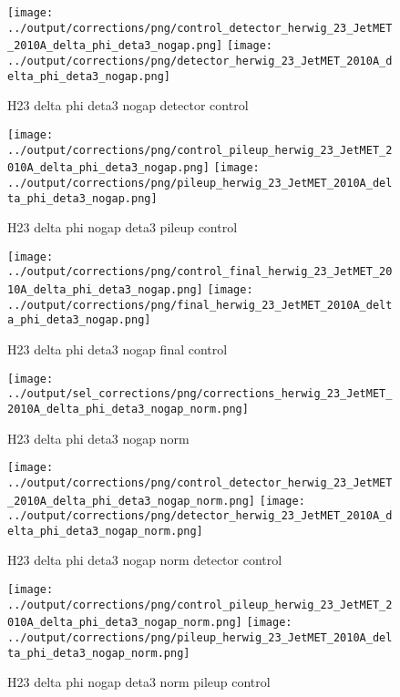 \documentclass[11pt]{book}
\begin{document}
\begin{figure}[ht]
\centering
\texttt{[image: ../output/corrections/png/control\_detector\_herwig\_23\_JetMET\_2010A\_delta\_phi\_deta3\_nogap.png]}
\texttt{[image: ../output/corrections/png/detector\_herwig\_23\_JetMET\_2010A\_delta\_phi\_deta3\_nogap.png]}
\caption{H23 delta phi deta3 nogap detector control}
\label{fig:H23_JetMET_2010A_delta_phi_deta3_nogap_detector_control}
\end{figure}

\begin{figure}[ht]
\centering
\texttt{[image: ../output/corrections/png/control\_pileup\_herwig\_23\_JetMET\_2010A\_delta\_phi\_deta3\_nogap.png]}
\texttt{[image: ../output/corrections/png/pileup\_herwig\_23\_JetMET\_2010A\_delta\_phi\_deta3\_nogap.png]}
\caption{H23 delta phi nogap deta3 pileup control}
\label{fig:H23_JetMET_2010A_delta_phi_deta3_nogap_pileup_control}
\end{figure}


\begin{figure}[ht]
\centering
\texttt{[image: ../output/corrections/png/control\_final\_herwig\_23\_JetMET\_2010A\_delta\_phi\_deta3\_nogap.png]}
\texttt{[image: ../output/corrections/png/final\_herwig\_23\_JetMET\_2010A\_delta\_phi\_deta3\_nogap.png]}
\caption{H23 delta phi deta3 nogap final control}
\label{fig:H23_JetMET_2010A_delta_phi_deta3_nogap_final_control}
\end{figure}

\begin{figure}[ht]
\centering
\texttt{[image: ../output/sel\_corrections/png/corrections\_herwig\_23\_JetMET\_2010A\_delta\_phi\_deta3\_nogap\_norm.png]}
\caption{H23 delta phi deta3 nogap norm}
\label{fig:H23_JetMET_2010A_delta_phi_deta3_nogap_norm}
\end{figure}

\begin{figure}[ht]
\centering
\texttt{[image: ../output/corrections/png/control\_detector\_herwig\_23\_JetMET\_2010A\_delta\_phi\_deta3\_nogap\_norm.png]}
\texttt{[image: ../output/corrections/png/detector\_herwig\_23\_JetMET\_2010A\_delta\_phi\_deta3\_nogap\_norm.png]}
\caption{H23 delta phi deta3 nogap norm detector control}
\label{fig:H23_JetMET_2010A_delta_phi_deta3_nogap_norm_detector_control}
\end{figure}

\begin{figure}[ht]
\centering
\texttt{[image: ../output/corrections/png/control\_pileup\_herwig\_23\_JetMET\_2010A\_delta\_phi\_deta3\_nogap\_norm.png]}
\texttt{[image: ../output/corrections/png/pileup\_herwig\_23\_JetMET\_2010A\_delta\_phi\_deta3\_nogap\_norm.png]}
\caption{H23 delta phi nogap deta3 norm pileup control}
\label{fig:H23_JetMET_2010A_delta_phi_deta3_nogap_norm_pileup_control}
\end{figure}
\end{document}
